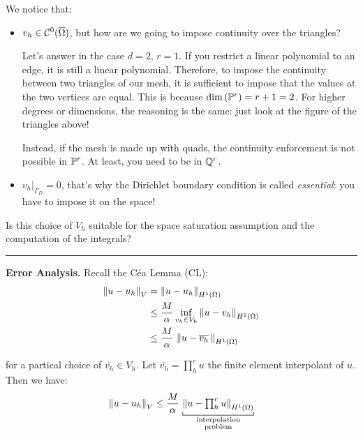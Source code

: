 We notice that:
\begin{itemize}
\item $v_h\in\mathcal{C}^0(\overline{\Omega})$, but how are we going to impose continuity over the triangles?

Let's answer in the case $d=2$, $r=1$. If you restrict a linear polynomial to an edge, it is still a linear polynomial. Therefore, to impose the continuity between two triangles of our mesh, it is sufficient to impose that the values at the two vertices are equal. This is because $\text{dim}\,(\mathbb{P}^r)=r+1=2$. For higher degrees or dimensions, the reasoning is the same: just look at the figure of the triangles above!

Instead, if the mesh is made up with quads, the continuity enforcement is not possible in $\mathbb{P}^r$. At least, you need to be in $\mathbb{Q}^r$.

\item $v_h\big|_{\Gamma_D}=0$, that's why the Dirichlet boundary condition is called \emph{essential}: you have to impose it on the space!
\end{itemize}

Is this choice of $V_h$ suitable for the space saturation assumption and the computation of the integrals?

\rule{0.47\textwidth}{0.2pt}

\textbf{Error Analysis.} Recall the Céa Lemma (CL):
\begin{equation*}
\begin{aligned}
\left\lVert u-u_h \right\rVert_V&=\left\lVert u-u_h \right\rVert_{H^1(\Omega)} \\
&\leq \frac{M}{\alpha} \inf_{v_h\in V_h} \left\lVert u-v_h \right\rVert_{H^1(\Omega)} \\
&\leq \frac{M}{\alpha}\, \left\lVert u-\overline{v_h}\, \right\rVert_{H^1(\Omega)}
\end{aligned}
\end{equation*}

for a partical choice of $\overline{v_h}\in V_h$. Let $\overline{v_h}=\prod_h^r u$ the finite element interpolant of $u$. Then we have:
\begin{equation}
\label{eq:interbds}
\norm{u-u_h}_V\leq \frac{M}{\alpha}\, \underbracket[0.5pt]{\norm{u-\textstyle\prod_h^r u}_{H^1(\Omega)}}_{\substack{\text{interpolation}\\\text{problem}}}
\end{equation}

